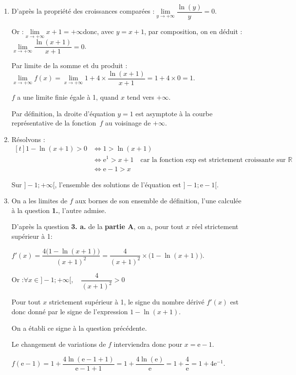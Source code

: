 \documentclass[10pt]{article}
\providecommand{\R}{\mathbb{R}}
\providecommand{\e}{{\mathrm{e}}}
\begin{document}
	\begin{enumerate}
		\item D'après la propriété des croissances comparées :\quad $\lim\limits_{y \to +\infty} \dfrac{\ln(y)}{y} = 0$.

		Or :\quad $\lim\limits_{x \to +\infty} x+ 1 = + \infty$\quad donc, avec $y = x+1$, par composition, on en déduit :\quad $\lim\limits_{x \to +\infty} \dfrac{\ln(x+1)}{x+1} = 0$.

		Par limite de la somme et du produit :\quad $\lim\limits_{x \to +\infty} f(x) = \lim\limits_{x \to +\infty} 1 + 4\times \dfrac{\ln(x+1)}{x+1} = 1 + 4\times 0 = 1$.

		$f$ a une limite finie égale à 1, quand $x$ tend vers $+\infty$.

		Par définition, la droite d'équation \quad $y=1$ \quad est asymptote à la courbe représentative de la fonction~$f$ au voisinage de $+\infty$.

		\item Résolvons :\quad $\begin{aligned}[t]
			1-\ln (x+1)>0
				&\iff 1 > \ln(x+1)\\
				&\iff \e^{1} > x+1 \quad \text{car la fonction exp est strictement croissante sur }\R\\
				&\iff \e - 1 > x
		\end{aligned}$

		Sur $]-1 ;+\infty[$, l'ensemble des solutions de l'équation est $]-1 ; \e - 1[$.

		\item On a les limites de $f$ aux bornes de son ensemble de définition, l'une calculée à la question \textbf{1.}, l'autre admise.

		D'après la question \textbf{3. a.} de la \textbf{partie A}, on a, pour tout $x$ réel strictement supérieur à 1:

		$f'(x) = \dfrac{4\big(1 - \ln(x+1)\big)}{(x+1)^2} = \dfrac{4}{(x+1)^2} \times \big(1 - \ln(x+1)\big)$.

		Or :\quad $\forall x \in ]-1 ; +\infty[,\quad \dfrac{4}{(x+1)^2} > 0$

		Pour tout $x$ strictement supérieur à 1, le signe du nombre dérivé $f'(x)$ est donc donné par le signe de l'expression \quad$1 - \ln(x+1)$.

		On a établi ce signe à la question précédente.

		Le changement de variations de $f$ interviendra donc pour $x = \e - 1$.

		$f(\e - 1) = 1 + \dfrac{4\ln(\e - 1 + 1)}{\e - 1 + 1} = 1 + \dfrac{4\ln(\e)}{\e}= 1 + \dfrac{4}{\e} = 1 + 4\e^{-1}$.


\end{enumerate}
\end{document}
